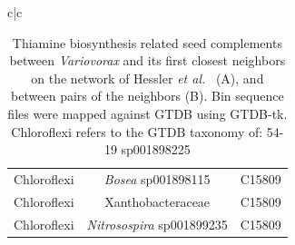 \documentclass[sn-mathphys,Numbered]{sn-jnl}  %
\theoremstyle{thmstyleone}%
\theoremstyle{thmstyletwo}%
\theoremstyle{thmstylethree}%
\begin{document}
\begin{table}[ht]
\begin{minipage}{\linewidth}
\begin{adjustbox}{width=1.3\textwidth,center=\textwidth}
\begin{tabular}{c|c}
\begin{tabular}{ccc}
                            Chloroflexi & \textit{Bosea} sp001898115 & C15809 \\
                            Chloroflexi & Xanthobacteraceae & C15809 \\
                            Chloroflexi & \textit{Nitrosospira} sp001899235 & C15809 \\
                        \end{tabular} \\
                    \end{tabular} \\
                \end{adjustbox}
            \caption{ 
                Thiamine biosynthesis related seed complements between \textit{Variovorax} and its first closest neighbors on the network of Hessler \textit{et al.}~\cite{hessler2023vitamin} (A), and between pairs of the neighbors (B).
                Bin sequence files were mapped against GTDB using GTDB-tk. 
                Chloroflexi refers to the GTDB taxonomy of: 54-19 sp001898225
            }
            \label{tab:Variovorax}
            \end{minipage}
            \end{table}
    
    




\end{document}

